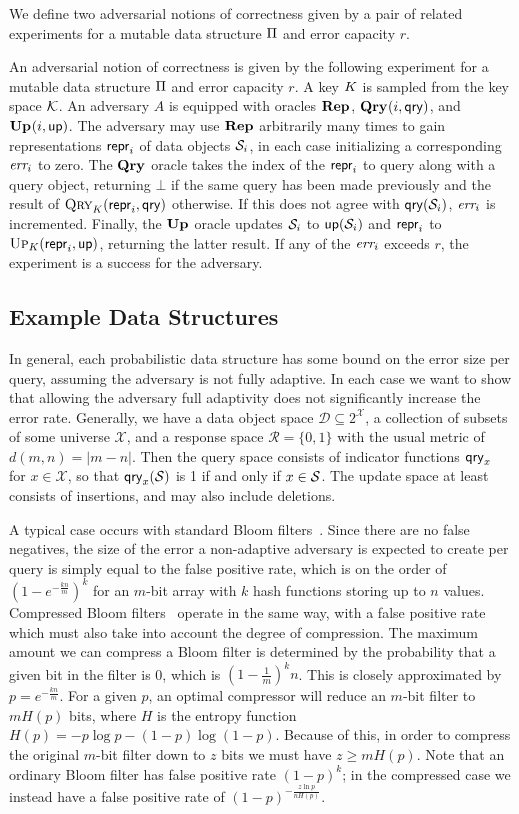We define two adversarial notions of correctness given by a pair of related experiments for a mutable data structure $\mathrm{\Pi}$ and error capacity $r$.

An adversarial notion of correctness is given by the following experiment for a mutable data structure $\mathrm{\Pi}$ and error capacity $r$. A key $K$ is sampled from the key space $\mathcal{K}$. An adversary $A$ is equipped with oracles $\mathbf{Rep}\hspace{0.5pt}$, $\mathbf{Qry}\hspace{0.5pt}(i,\mathsf{qry})$, and $\mathbf{Up}\hspace{0.5pt}(i,\mathsf{up})$. The adversary may use $\mathbf{Rep}\hspace{0.5pt}$ arbitrarily many times to gain representations $\mathsf{repr}_i$ of data objects $\mathcal{S}_i$, in each case initializing a corresponding $\textit{err}_i$ to zero. The $\mathbf{Qry}\hspace{0.5pt}$ oracle takes the index of the $\mathsf{repr}_i$ to query along with a query object, returning $\bot$ if the same query has been made previously and the result of $\textsc{Qry}_K(\mathsf{repr}_i,\mathsf{qry})$ otherwise. If this does not agree with $\mathsf{qry}(\mathcal{S}_i)$, $\textit{err}_i$ is incremented. Finally, the $\mathbf{Up}\hspace{0.5pt}$ oracle updates $\mathcal{S}_i$ to $\mathsf{up}(\mathcal{S}_i)$ and $\mathsf{repr}_i$ to $\textsc{Up}_K(\mathsf{repr}_i,\mathsf{up})$, returning the latter result. If any of the $\textit{err}_i$ exceeds $r$, the experiment is a success for the adversary.

\subsection{Example Data Structures}

In general, each probabilistic data structure has some bound on the error size per query, assuming the adversary is not fully adaptive. In each case we want to show that allowing the adversary full adaptivity does not significantly increase the error rate. Generally, we have a data object space $\mathcal{D} \subseteq 2^\mathcal{X}$, a collection of subsets of some universe $\mathcal{X}$, and a response space $\mathcal{R} = \{0,1\}$ with the usual metric of $d(m,n) = |m-n|$. Then the query space consists of indicator functions $\mathsf{qry}_x$ for $x \in \mathcal{X}$, so that $\mathsf{qry}_x(\mathcal{S})$ is 1 if and only if $x \in \mathcal{S}$. The update space at least consists of insertions, and may also include deletions.

A typical case occurs with standard Bloom filters~\cite{bloomfilter}. Since there are no false negatives, the size of the error a non-adaptive adversary is expected to create per query is simply equal to the false positive rate, which is on the order of $(1-e^{-\frac{kn}{m}})^k$ for an $m$-bit array with $k$ hash functions storing up to $n$ values. Compressed Bloom filters~\cite{xxx} operate in the same way, with a false positive rate which must also take into account the degree of compression. The maximum amount we can compress a Bloom filter is determined by the probability that a given bit in the filter is 0, which is $\left(1-\frac{1}{m}\right)^kn$. This is closely approximated by $p = e^{-\frac{kn}{m}}$. For a given $p$, an optimal compressor will reduce an $m$-bit filter to $mH(p)$ bits, where $H$ is the entropy function $H(p) = -p\log p - (1-p)\log(1-p)$. Because of this, in order to compress the original $m$-bit filter down to $z$ bits we must have $z \ge mH(p)$. Note that an ordinary Bloom filter has false positive rate $(1-p)^k$; in the compressed case we instead have a false positive rate of $(1-p)^{-\frac{z \ln p}{nH(p)}}$.

